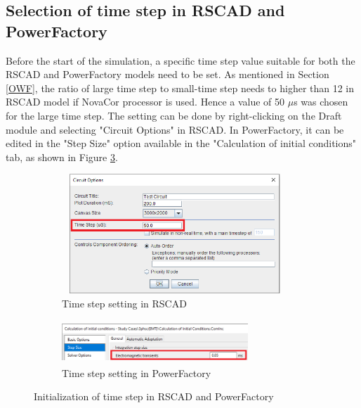 \subsection{Selection of time step in RSCAD and PowerFactory}
Before the start of the simulation, a specific time step value suitable for both the RSCAD and PowerFactory models need to be set. As mentioned in Section \ref{OWF}, the ratio of large time step to small-time step needs to higher than 12 in RSCAD model if NovaCor processor is used. Hence a value of 50 $\mu$s was chosen for the large time step. The setting can be done by right-clicking on the Draft module and selecting "Circuit Options" in RSCAD. In PowerFactory, it can be edited in the "Step Size" option available in the "Calculation of initial conditions" tab, as shown in Figure \ref{fig:Stepsize_RSCAD_PFD}.  

\begin{figure}[H]
\centering
\begin{subfigure}{.55\textwidth}
  \centering
  \includegraphics[height=4.5cm,width=8.5cm]{Diagrams/Chapter_3/Stepsize_RSCAD.PNG}
  \caption{Time step setting in RSCAD}
  \label{Stepsize_RSCAD}
\end{subfigure}%
\begin{subfigure}{.45\textwidth}
  \centering
  \includegraphics[height=1.6cm,width=7cm]{Diagrams/Chapter_3/Stepsize_PFD_Zoom.PNG}
  \caption{Time step setting in PowerFactory}
  \label{Stepsize_PFD_Zoom}
\end{subfigure}
\caption{Initialization of time step in RSCAD and PowerFactory}
\label{fig:Stepsize_RSCAD_PFD}
\end{figure}

